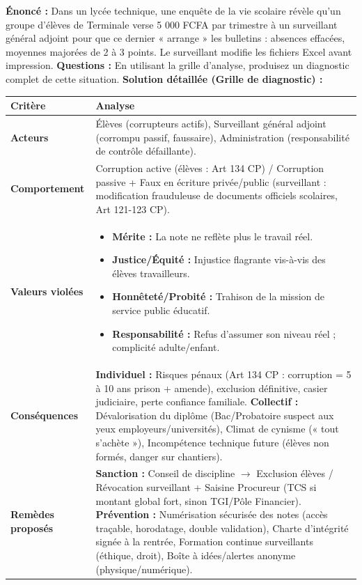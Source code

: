 \documentclass[11pt]{article}
\newcommand{\cle}[1]{{\popxbold\color{popdark}#1}}
\begin{document}
\begin{exoresolu}
    \textbf{Énoncé :} Dans un lycée technique, une enquête de la vie scolaire révèle qu'un groupe d'élèves de Terminale verse 5 000 FCFA par trimestre à un surveillant général adjoint pour que ce dernier « arrange » les bulletins : absences effacées, moyennes majorées de 2 à 3 points. Le surveillant modifie les fichiers Excel avant impression.
    \textbf{Questions :} En utilisant la grille d'analyse, produisez un diagnostic complet de cette situation.
    \tcblower
    \textbf{Solution détaillée (Grille de diagnostic) :}

    \begin{center}
    \begin{tabularx}{\linewidth}{|l|X|}\hline
    \textbf{Critère} & \textbf{Analyse} \\ \hline
    \textbf{Acteurs} & Élèves (corrupteurs actifs), Surveillant général adjoint (corrompu passif, faussaire), Administration (responsabilité de contrôle défaillante). \\ \hline
    \textbf{Comportement} & \cle{Corruption active} (élèves : Art 134 CP) / \cle{Corruption passive} + \cle{Faux en écriture privée/public} (surveillant : modification frauduleuse de documents officiels scolaires, Art 121-123 CP). \\ \hline
    \textbf{Valeurs violées} & \begin{itemize}\item \textbf{Mérite :} La note ne reflète plus le travail réel.
    \item \textbf{Justice/Équité :} Injustice flagrante vis-à-vis des élèves travailleurs.
    \item \textbf{Honnêteté/Probité :} Trahison de la mission de service public éducatif.
    \item \textbf{Responsabilité :} Refus d'assumer son niveau réel ; complicité adulte/enfant.
    \end{itemize} \\ \hline
    \textbf{Conséquences} & \textbf{Individuel :} Risques pénaux (Art 134 CP : corruption = 5 à 10 ans prison + amende), exclusion définitive, casier judiciaire, perte confiance familiale.
    \textbf{Collectif :} \cle{Dévalorisation du diplôme} (Bac/Probatoire suspect aux yeux employeurs/universités), \cle{Climat de cynisme} (« tout s'achète »), \cle{Incompétence technique} future (élèves non formés, danger sur chantiers). \\ \hline
    \textbf{Remèdes proposés} & \textbf{Sanction :} Conseil de discipline $\rightarrow$ Exclusion élèves / Révocation surveillant + Saisine Procureur (TCS si montant global fort, sinon TGI/Pôle Financier).
    \textbf{Prévention :} Numérisation sécurisée des notes (accès traçable, horodatage, double validation), Charte d'intégrité signée à la rentrée, Formation continue surveillants (éthique, droit), Boîte à idées/alertes anonyme (physique/numérique). \\ \hline
    \end{tabularx}
    \end{center}


\end{exoresolu}
\end{document}
